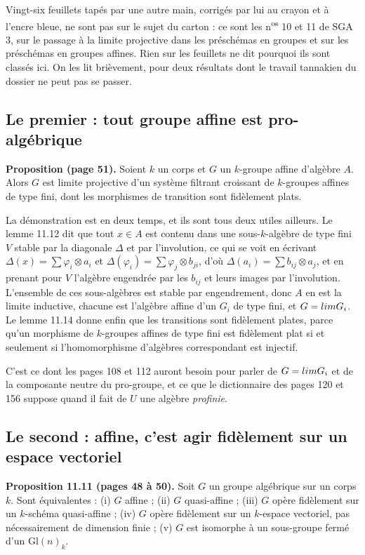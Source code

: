 \documentclass[11pt,a4paper]{article}
\begin{document}
Vingt-six feuillets tapés par une autre main, corrigés par lui au crayon et à
l'encre bleue, ne sont pas sur le sujet du carton : ce sont les
n\textsuperscript{os} 10 et 11 de SGA 3, sur le passage à la limite projective
dans les préschémas en groupes et sur les préschémas en groupes affines. Rien
sur les feuillets ne dit pourquoi ils sont classés ici. On les lit brièvement,
pour deux résultats dont le travail tannakien du dossier ne peut pas se
passer.

\subsection*{Le premier : tout groupe affine est pro-algébrique}

\textbf{Proposition (page 51).} Soient $k$ un corps et $G$ un $k$-groupe affine
d'algèbre $A$. Alors $G$ est limite projective d'un système filtrant croissant
de $k$-groupes affines de type fini, dont les morphismes de transition sont
fidèlement plats.

La démonstration est en deux temps, et ils sont tous deux utiles ailleurs. Le
lemme 11.12 dit que tout $x \in A$ est contenu dans une sous-$k$-algèbre de
type fini $V$ stable par la diagonale $\Delta$ et par l'involution, ce qui
se voit en écrivant $\Delta(x) = \sum \varphi_{i} \otimes a_{i}$ et
$\Delta(\varphi_{i}) = \sum \varphi_{j} \otimes b_{ji}$, d'où $\Delta(a_{i}) =
\sum b_{ij} \otimes a_{j}$, et en prenant pour $V$ l'algèbre engendrée par les
$b_{ij}$ et leurs images par l'involution. L'ensemble de ces sous-algèbres est
stable par engendrement, donc $A$ en est la limite inductive, chacune est
l'algèbre affine d'un $G_{i}$ de type fini, et $G = \varprojlim G_{i}$. Le lemme
11.14 donne enfin que les transitions sont fidèlement plates, parce qu'un
morphisme de $k$-groupes affines de type fini est fidèlement plat si et
seulement si l'homomorphisme d'algèbres correspondant est injectif.

C'est ce dont les pages 108 et 112 auront besoin pour parler de
$G = \varprojlim G_{i}$ et de la composante neutre du pro-groupe, et ce que le
dictionnaire des pages 120 et 156 suppose quand il fait de $U$ une algèbre
\emph{profinie}.

\subsection*{Le second : affine, c'est agir fidèlement sur un espace vectoriel}

\textbf{Proposition 11.11 (pages 48 à 50).} Soit $G$ un groupe algébrique sur
un corps $k$. Sont équivalentes : (i) $G$ affine ; (ii) $G$ quasi-affine ;
(iii) $G$ opère fidèlement sur un $k$-schéma quasi-affine ; (iv) $G$ opère
fidèlement sur un $k$-espace vectoriel, pas nécessairement de dimension
finie ; (v) $G$ est isomorphe à un sous-groupe fermé d'un
$\mathrm{Gl}(n)_{k}$.
\end{document}

